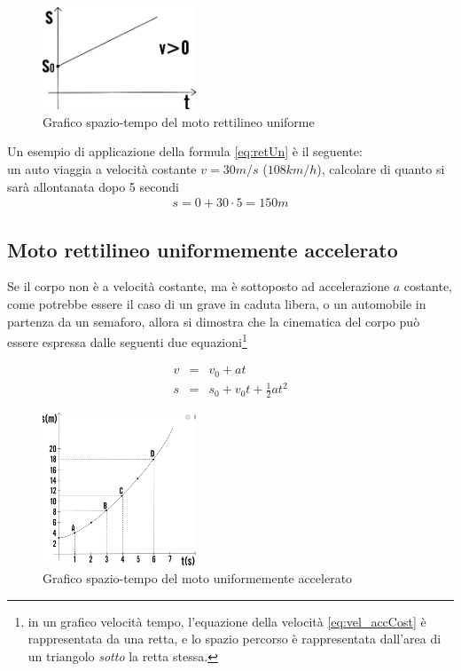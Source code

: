 \documentclass[17pt]{extarticle}
\begin{document}
\begin{figure}[h!]		
	\centering
   	\includegraphics[width=1.8in]{graficoST_rettUniforme.png}
  	\caption{Grafico spazio-tempo del moto rettilineo uniforme}
   	\label{fig:graficoST_rettUniforme}
\end{figure}

Un esempio di applicazione della formula \ref{eq:retUn} è il seguente:\\
un auto viaggia a velocità costante $ v = 30m/s$ ($108km/h$), calcolare di quanto si sarà allontanata dopo 5 secondi
\begin{eqnarray}
	s = 0 + 30\cdot 5 = 150 m
\end{eqnarray}


\subsection{Moto rettilineo uniformemente accelerato}\label{SPar:unAcc}

Se il corpo non è a velocità costante, ma è sottoposto ad accelerazione $a$ costante, come potrebbe essere il caso di un grave in caduta libera, o un automobile in partenza da un semaforo, allora si dimostra che la cinematica del corpo può essere espressa dalle seguenti due equazioni\footnote{in un grafico velocità tempo, l'equazione della velocità \ref{eq:vel_accCost} è rappresentata da una retta, e lo spazio percorso è rappresentata dall'area di un triangolo \emph{sotto} la retta stessa.}

\begin{eqnarray}\label{eq:vel_accCost}
	v & = & v_0 + at\\ \label{eq:pos_accCost}
	s & = & s_0 + v_0t + \frac{1}{2}at^2
\end{eqnarray}


\begin{figure}[h!]		
	\centering
   	\includegraphics[width=1.8in]{graficoST_unAcc.png}%
  	\caption{Grafico spazio-tempo del moto uniformemente accelerato}
   	\label{fig:graficoST_unAcce}
\end{figure}
\end{document}

